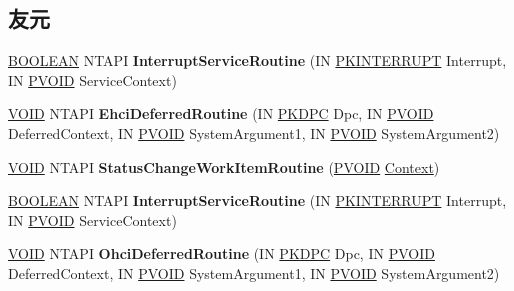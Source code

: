 \subsection*{友元}
\begin{DoxyCompactItemize}
\item 
\mbox{\label{class_c_u_s_b_hardware_device_a58b9b83976d2aa3f239f6982c5fc3b03}} 
\hyperlink{_processor_bind_8h_a112e3146cb38b6ee95e64d85842e380a}{B\+O\+O\+L\+E\+AN} N\+T\+A\+PI {\bfseries Interrupt\+Service\+Routine} (IN \hyperlink{struct___k_i_n_t_e_r_r_u_p_t}{P\+K\+I\+N\+T\+E\+R\+R\+U\+PT} Interrupt, IN \hyperlink{interfacevoid}{P\+V\+O\+ID} Service\+Context)
\item 
\mbox{\label{class_c_u_s_b_hardware_device_a5201edbf46b939ad1fe90eb610e204ca}} 
\hyperlink{interfacevoid}{V\+O\+ID} N\+T\+A\+PI {\bfseries Ehci\+Deferred\+Routine} (IN \hyperlink{struct___k_d_p_c}{P\+K\+D\+PC} Dpc, IN \hyperlink{interfacevoid}{P\+V\+O\+ID} Deferred\+Context, IN \hyperlink{interfacevoid}{P\+V\+O\+ID} System\+Argument1, IN \hyperlink{interfacevoid}{P\+V\+O\+ID} System\+Argument2)
\item 
\mbox{\label{class_c_u_s_b_hardware_device_a8dddae78d632e9287591b32090d4a0e8}} 
\hyperlink{interfacevoid}{V\+O\+ID} N\+T\+A\+PI {\bfseries Status\+Change\+Work\+Item\+Routine} (\hyperlink{interfacevoid}{P\+V\+O\+ID} \hyperlink{struct_context}{Context})
\item 
\mbox{\label{class_c_u_s_b_hardware_device_a58b9b83976d2aa3f239f6982c5fc3b03}} 
\hyperlink{_processor_bind_8h_a112e3146cb38b6ee95e64d85842e380a}{B\+O\+O\+L\+E\+AN} N\+T\+A\+PI {\bfseries Interrupt\+Service\+Routine} (IN \hyperlink{struct___k_i_n_t_e_r_r_u_p_t}{P\+K\+I\+N\+T\+E\+R\+R\+U\+PT} Interrupt, IN \hyperlink{interfacevoid}{P\+V\+O\+ID} Service\+Context)
\item 
\mbox{\label{class_c_u_s_b_hardware_device_a233eda555db454eb7c51d2db925e3a24}} 
\hyperlink{interfacevoid}{V\+O\+ID} N\+T\+A\+PI {\bfseries Ohci\+Deferred\+Routine} (IN \hyperlink{struct___k_d_p_c}{P\+K\+D\+PC} Dpc, IN \hyperlink{interfacevoid}{P\+V\+O\+ID} Deferred\+Context, IN \hyperlink{interfacevoid}{P\+V\+O\+ID} System\+Argument1, IN \hyperlink{interfacevoid}{P\+V\+O\+ID} System\+Argument2)

\end{DoxyCompactItemize}
